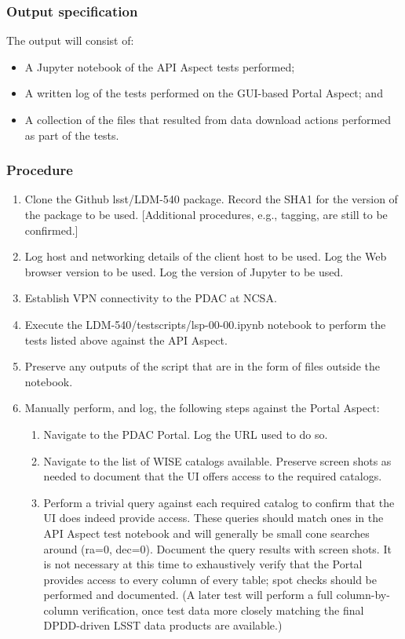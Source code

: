 \subsubsection{Output specification}

The output will consist of:

\begin{itemize}
  \item{A Jupyter notebook of the API Aspect tests performed;}
  \item{A written log of the tests performed on the GUI-based Portal Aspect; and}
  \item{A collection of the files that resulted from data download actions performed as part of the tests.}
\end{itemize}


\subsubsection{Procedure}

\begin{enumerate}

  \item{Clone the Github lsst/LDM-540 package.  Record the SHA1 for the version of the package to be used.  [Additional procedures, e.g., tagging, are still to be confirmed.]}
  \item{Log host and networking details of the client host to be used.
 Log the Web browser version to be used.
 Log the version of Jupyter to be used.}
  \item{Establish VPN connectivity to the PDAC at NCSA.}
  \item{Execute the LDM-540/test\textunderscore scripts/lsp-00-00.ipynb notebook to perform the tests listed above against the API Aspect.}
  \item{Preserve any outputs of the script that are in the form of files outside the notebook.}
  \item{Manually perform, and log, the following steps against the Portal Aspect:
    \begin{enumerate}
      \item{Navigate to the PDAC Portal.  Log the URL used to do so.}
      \item{Navigate to the list of WISE catalogs available.  Preserve screen shots as needed to document that the UI offers access to the required catalogs.}
      \item{Perform a trivial query against each required catalog to confirm that the UI does indeed provide access.
 These queries should match ones in the API Aspect test notebook and will generally be small cone searches around (ra=0, dec=0).
 Document the query results with screen shots.
 It is not necessary at this time to exhaustively verify that the Portal provides access to every column of every table; spot checks should be performed and documented.
 (A later test will perform a full column-by-column verification, once test data more closely matching the final DPDD-driven LSST data products are available.)}
    \end{enumerate}
  }

\end{enumerate}
